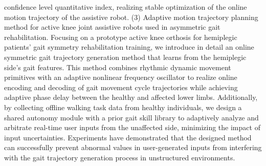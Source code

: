 \begin{abstract*}
confidence level quantitative index, realizing stable optimization of the online motion trajectory of the assistive robot. (3) Adaptive motion trajectory planning method for active knee joint assistive robots used in asymmetric gait rehabilitation. Focusing on a prototype active knee orthosis for hemiplegic patients' gait symmetry rehabilitation training, we introduce in detail an online symmetric gait trajectory generation method that learns from the hemiplegic side's gait features. This method combines rhythmic dynamic movement primitives with an adaptive nonlinear frequency oscillator to realize online encoding and decoding of gait movement cycle trajectories while achieving adaptive phase delay between the healthy and affected lower limbs. Additionally, by collecting offline walking task data from healthy individuals, we design a shared autonomy module with a prior gait skill library to adaptively analyze and arbitrate real-time user inputs from the unaffected side, minimizing the impact of input uncertainties. Experiments have demonstrated that the designed method can successfully prevent abnormal values in user-generated inputs from interfering with the gait trajectory generation process in unstructured environments.
\end{abstract*}
